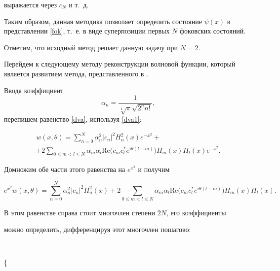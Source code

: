 выражается через $c_N$ и т.~д. 

Таким образом, данная методика позволяет  определить состояние $\psi(x)$ в представлении \eqref{fok}, т.~е. в виде суперпозиции первых $N$ фоковских состояний.

Отметим, что исходный метод \cite{orlow} решает данную задачу при $N=2$.







Перейдем к следующему методу реконструкции волновой функции, который является развитием метода, представленного в \cite{dnn}.

 Вводя коэффициент $$\alpha_n=\frac{1}{\sqrt[4]{\pi}\sqrt{2^n n!}},

 $$ перепишем равенство \eqref{dva}, используя \eqref{dva1}:

\begin{multline}

w(x,{\theta})= \sum\limits_{n=0}^{N}\alpha_n^2|c_n|^2  H_n^2 (x)e^{-x^2}  + \\

+  2 \sum\limits_{0\leqslant m < l \leqslant N}\alpha_m \alpha_l \text{Re} \big(c_m c_l^* e^{i{\theta}(l-m)}\big)H_m (x)H_l (x)e^{-x^2}.

\end{multline}

Домножим обе части этого равенства на $e^{x^2}$ и получим

\begin{equation}\label{dva2}

e^{x^2}w(x,\theta)= \sum\limits_{n=0}^{N}\alpha_n^2|c_n|^2  H_n^2 (x)  +  2 \sum\limits_{0\leqslant m < l \leqslant N}\alpha_m \alpha_l\text{Re} \big(c_m c_l^* e^{i{\theta}

(l-m)}\big)H_m (x)H_l (x).

\end{equation}

В этом равенстве справа стоит многочлен степени $2N$, его коэффициенты 

можно определить, дифференцируя этот многочлен пошагово:

$$

           \left\{

